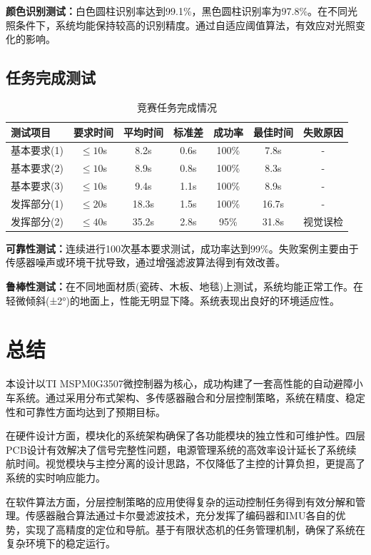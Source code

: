 \documentclass[UTF8]{ctexart}
\begin{document}
	\textbf{颜色识别测试：}白色圆柱识别率达到99.1\%，黑色圆柱识别率为97.8\%。在不同光照条件下，系统均能保持较高的识别精度。通过自适应阈值算法，有效应对光照变化的影响。
	
	\subsection{任务完成测试}
	
	\begin{table}[H]
		\centering
		\caption{竞赛任务完成情况}
		\begin{tabular}{lcccccc}
			\toprule
			测试项目 & 要求时间 & 平均时间 & 标准差 & 成功率 & 最佳时间 & 失败原因 \\
			\midrule
			基本要求(1) & $\leq 10$s & 8.2s & 0.6s & 100\% & 7.8s & - \\
			基本要求(2) & $\leq 10$s & 8.9s & 0.8s & 100\% & 8.3s & - \\
			基本要求(3) & $\leq 10$s & 9.4s & 1.1s & 100\% & 8.9s & - \\
			发挥部分(1) & $\leq 20$s & 18.3s & 1.5s & 100\% & 16.7s & - \\
			发挥部分(2) & $\leq 40$s & 35.2s & 2.8s & 95\% & 31.8s & 视觉误检 \\
			\bottomrule
		\end{tabular}
	\end{table}
	
	\textbf{可靠性测试：}连续进行100次基本要求测试，成功率达到99\%。失败案例主要由于传感器噪声或环境干扰导致，通过增强滤波算法得到有效改善。
	
	\textbf{鲁棒性测试：}在不同地面材质(瓷砖、木板、地毯)上测试，系统均能正常工作。在轻微倾斜(±2°)的地面上，性能无明显下降。系统表现出良好的环境适应性。
	
		\section{总结}
	
	\indent 本设计以TI MSPM0G3507微控制器为核心，成功构建了一套高性能的自动避障小车系统。通过采用分布式架构、多传感器融合和分层控制策略，系统在精度、稳定性和可靠性方面均达到了预期目标。
	
	\indent 在硬件设计方面，模块化的系统架构确保了各功能模块的独立性和可维护性。四层PCB设计有效解决了信号完整性问题，电源管理系统的高效率设计延长了系统续航时间。视觉模块与主控分离的设计思路，不仅降低了主控的计算负担，更提高了系统的实时响应能力。
	
	\indent 在软件算法方面，分层控制策略的应用使得复杂的运动控制任务得到有效分解和管理。传感器融合算法通过卡尔曼滤波技术，充分发挥了编码器和IMU各自的优势，实现了高精度的定位和导航。基于有限状态机的任务管理机制，确保了系统在复杂环境下的稳定运行。
	
\end{document}
